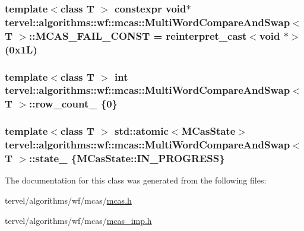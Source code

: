 \subsubsection[{M\+C\+A\+S\+\_\+\+F\+A\+I\+L\+\_\+\+C\+O\+N\+S\+T}]{\setlength{\rightskip}{0pt plus 5cm}template$<$class T $>$ constexpr void$\ast$ {\bf tervel\+::algorithms\+::wf\+::mcas\+::\+Multi\+Word\+Compare\+And\+Swap}$<$ T $>$\+::M\+C\+A\+S\+\_\+\+F\+A\+I\+L\+\_\+\+C\+O\+N\+S\+T = reinterpret\+\_\+cast$<$void $\ast$$>$(0x1\+L)\hspace{0.3cm}{\ttfamily [static]}}\label{classtervel_1_1algorithms_1_1wf_1_1mcas_1_1_multi_word_compare_and_swap_a7f918a073a882ba1219855a9e03db2f6}
\hypertarget{classtervel_1_1algorithms_1_1wf_1_1mcas_1_1_multi_word_compare_and_swap_a7e5a630e068ea866a43d4ad17fe71b98}{}
\subsubsection[{row\+\_\+count\+\_\+}]{\setlength{\rightskip}{0pt plus 5cm}template$<$class T $>$ int {\bf tervel\+::algorithms\+::wf\+::mcas\+::\+Multi\+Word\+Compare\+And\+Swap}$<$ T $>$\+::row\+\_\+count\+\_\+ \{0\}\hspace{0.3cm}{\ttfamily [private]}}\label{classtervel_1_1algorithms_1_1wf_1_1mcas_1_1_multi_word_compare_and_swap_a7e5a630e068ea866a43d4ad17fe71b98}
\hypertarget{classtervel_1_1algorithms_1_1wf_1_1mcas_1_1_multi_word_compare_and_swap_a4d1104bb3f8bd1f0c2f4f93366c08224}{}
\subsubsection[{state\+\_\+}]{\setlength{\rightskip}{0pt plus 5cm}template$<$class T $>$ std\+::atomic$<${\bf M\+Cas\+State}$>$ {\bf tervel\+::algorithms\+::wf\+::mcas\+::\+Multi\+Word\+Compare\+And\+Swap}$<$ T $>$\+::state\+\_\+ \{{\bf M\+Cas\+State\+::\+I\+N\+\_\+\+P\+R\+O\+G\+R\+E\+S\+S}\}\hspace{0.3cm}{\ttfamily [private]}}\label{classtervel_1_1algorithms_1_1wf_1_1mcas_1_1_multi_word_compare_and_swap_a4d1104bb3f8bd1f0c2f4f93366c08224}


The documentation for this class was generated from the following files\+:\begin{DoxyCompactItemize}
\item 
tervel/algorithms/wf/mcas/\hyperlink{mcas_8h}{mcas.\+h}\item 
tervel/algorithms/wf/mcas/\hyperlink{mcas__imp_8h}{mcas\+\_\+imp.\+h}\end{DoxyCompactItemize}
